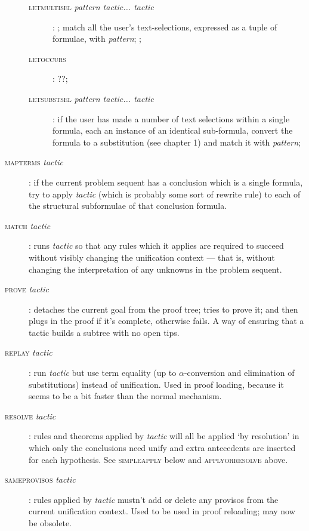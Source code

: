 \begin{description}
\begin{description}
\item [\textsc{letmultisel} \textit{pattern tactic... tactic}]: ; match all the user's text-selections, expressed as a tuple of formulae, with \textit{pattern}; ;
\item [\textsc{letoccurs}]: ??;

\item [\textsc{letsubstsel} \textit{pattern tactic... tactic}]: if the user has made a number of text selections within a single formula, each an instance of an identical sub-formula, convert the formula to a substitution (see chapter 1) and match it with \textit{pattern}; 

\end{description}


\item [\textsc{mapterms} \textit{tactic}]: if the current problem sequent has a conclusion which is a single formula, try to apply \textit{tactic} (which is probably some sort of rewrite rule) to each of the structural subformulae of that conclusion formula.

\item [\textsc{match} \textit{tactic}]: runs \textit{tactic} so that any rules which it applies are required to succeed without visibly changing the unification context --- that is, without changing the interpretation of any unknowns in the problem sequent.

\item [\textsc{prove} \textit{tactic}]: detaches the current goal from the proof tree; tries to prove it; and then plugs in the proof if it's complete, otherwise fails. A way of ensuring that a tactic builds a subtree with no open tips.

\item [\textsc{replay} \textit{tactic}]: run \textit{tactic} but use term equality (up to \ensuremath{\alpha}-conversion and elimination of substitutions) instead of unification. Used in proof loading, because it seems to be a bit faster than the normal mechanism.

\item [\textsc{resolve} \textit{tactic}]: rules and theorems applied by \textit{tactic} will all be applied `by resolution' in which only the conclusions need unify and extra antecedents are inserted for each hypothesis. See \textsc{simpleapply} below and \textsc{applyorresolve} above.


\item [\textsc{sameprovisos} \textit{tactic}]: rules applied by \textit{tactic} mustn't add or delete any provisos from the current unification context. Used to be used in proof reloading; may now be obsolete.



\end{description}
